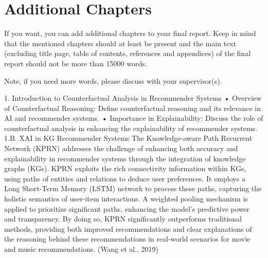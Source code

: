 \chapter{Additional Chapters}\label{chap:additional_chapters}

If you want, you can add additional chapters to your final report. Keep in mind that the mentioned chapters should at least be present and the main text (excluding title page, table of contents, references and appendices) of the final report should not be more than 15000 words.

Note, if you need more words, please discuss with your supervisor(s).

1. Introduction to Counterfactual Analysis in Recommender Systems
•	Overview of Counterfactual Reasoning: Define counterfactual reasoning and its relevance in AI and recommender systems.
•	Importance in Explainability: Discuss the role of counterfactual analysis in enhancing the explainability of recommender systems.
1.B. XAI in KG Recommender Systems
The Knowledge-aware Path Recurrent Network (KPRN) addresses the challenge of enhancing both accuracy and explainability in recommender systems through the integration of knowledge graphs (KGs). KPRN exploits the rich connectivity information within KGs, using paths of entities and relations to deduce user preferences. It employs a Long Short-Term Memory (LSTM) network to process these paths, capturing the holistic semantics of user-item interactions. A weighted pooling mechanism is applied to prioritize significant paths, enhancing the model's predictive power and transparency. By doing so, KPRN significantly outperforms traditional methods, providing both improved recommendations and clear explanations of the reasoning behind these recommendations in real-world scenarios for movie and music recommendations. (Wang et al., 2019)

